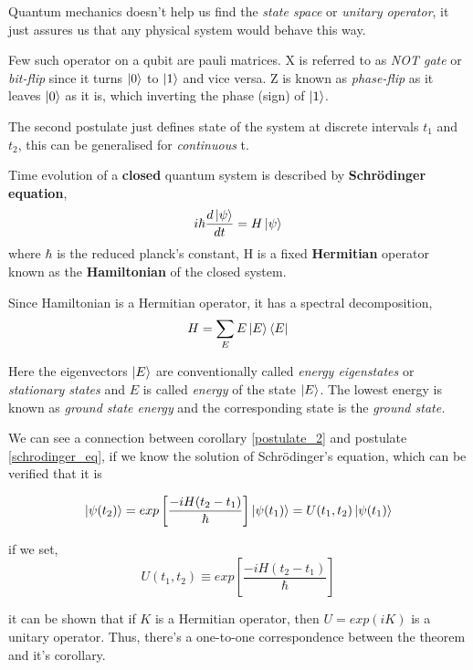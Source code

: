 Quantum mechanics doesn't help us find the \textit{state space} or \textit{unitary operator}, it just assures us that any physical system would behave this way.

Few such operator on a qubit are pauli matrices. X is referred to as \textit{NOT gate} or \textit{bit-flip} since it turns $\ket{0}$ to $\ket{1}$ and vice versa. Z is known as \textit{phase-flip} as it leaves $\ket{0}$ as it is, which inverting the phase (sign) of $\ket{1}$.

The second postulate just defines state of the system at discrete intervals $t_1$ and $t_2$, this can be generalised for \textit{continuous} t.
\begin{corollary}
    Time evolution of a \textbf{closed} quantum system is described by \textbf{Schrödinger equation},
    \begin{equation}
        i\hbar \frac{d\ket{\psi}}{dt}
        = H\ket{\psi}
    \end{equation}
    where $\hbar$ is the reduced planck's constant, H is a fixed \textbf{Hermitian} operator known as the \textbf{Hamiltonian} of the closed system.
    \label{schrodinger_eq}
\end{corollary}

Since Hamiltonian is a Hermitian operator, it has a spectral decomposition,
\begin{equation}
    H = \sum_E E\ket{E}\bra{E}
\end{equation}

Here the eigenvectors $\ket{E}$ are conventionally called \textit{energy eigenstates} or \textit{stationary states} and $E$ is called \textit{energy} of the state $\ket{E}$. The lowest energy is known as \textit{ground state energy} and the corresponding state is the \textit{ground state.}

We can see a connection between corollary \ref{postulate_2} and postulate \ref{schrodinger_eq}, if we know the solution of Schr\"{o}dinger's equation, which can be verified that it is

\begin{equation}
    \ket{\psi(t_2)} = exp\left[\frac{-iH(t_2-t_1)}{\hbar}\right]\ket{\psi(t_1)} = U(t_1,t_2)\ket{\psi(t_1)}
\end{equation}

if we set, 
\begin{equation}
    U(t_1,t_2) \equiv exp\left[\frac{-iH(t_2-t_1)}{\hbar}\right]
\end{equation}

it can be shown that if $K$ is a Hermitian operator, then $U=exp(iK)$ is a unitary operator. Thus, there's a one-to-one correspondence between the theorem and it's corollary.

